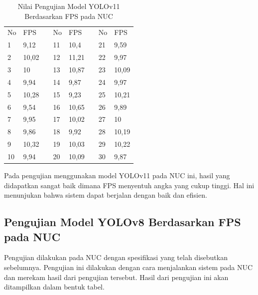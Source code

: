 \begin{table}[H]
  \caption{Nilai Pengujian Model YOLOv11 Berdasarkan FPS pada NUC} 
  \label{tb:TabelYolov11NUC}
  \centering
  \begin{tabular}{|l|l|l|l|l|l|l|l|}
  \cline{1-2} \cline{4-5} \cline{7-8}
  No & FPS   &  & No & FPS   &  & No & FPS   \\ \cline{1-2} \cline{4-5} \cline{7-8} 
  1  & 9,12  &  & 11 & 10,4  &  & 21 & 9,59  \\ \cline{1-2} \cline{4-5} \cline{7-8} 
  2  & 10,02 &  & 12 & 11,21 &  & 22 & 9,97  \\ \cline{1-2} \cline{4-5} \cline{7-8} 
  3  & 10    &  & 13 & 10,87 &  & 23 & 10,09 \\ \cline{1-2} \cline{4-5} \cline{7-8} 
  4  & 9,94  &  & 14 & 9,87  &  & 24 & 9,97  \\ \cline{1-2} \cline{4-5} \cline{7-8} 
  5  & 10,28 &  & 15 & 9,23  &  & 25 & 10,21 \\ \cline{1-2} \cline{4-5} \cline{7-8} 
  6  & 9,54  &  & 16 & 10,65 &  & 26 & 9,89  \\ \cline{1-2} \cline{4-5} \cline{7-8} 
  7  & 9,95  &  & 17 & 10,02 &  & 27 & 10    \\ \cline{1-2} \cline{4-5} \cline{7-8} 
  8  & 9,86  &  & 18 & 9,92  &  & 28 & 10,19 \\ \cline{1-2} \cline{4-5} \cline{7-8} 
  9  & 10,32 &  & 19 & 10,03 &  & 29 & 10,22 \\ \cline{1-2} \cline{4-5} \cline{7-8} 
  10 & 9,94  &  & 20 & 10,09 &  & 30 & 9,87  \\ \cline{1-2} \cline{4-5} \cline{7-8} 
  \end{tabular}
\end{table}

Pada pengujian menggunakan model YOLOv11 pada NUC ini, hasil yang didapatkan sangat baik dimana FPS menyentuh angka yang cukup tinggi. Hal ini menunjukan bahwa sistem dapat berjalan dengan baik dan efisien.

\subsection{Pengujian Model YOLOv8 Berdasarkan FPS pada NUC}

Pengujian dilakukan pada NUC dengan spesifikasi yang telah disebutkan sebelumnya. Pengujian ini dilakukan dengan cara menjalankan sistem pada NUC dan merekam hasil dari pengujian tersebut. Hasil dari pengujian ini akan ditampilkan dalam bentuk tabel.

